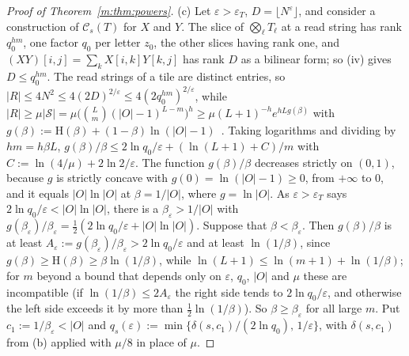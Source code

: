 \documentclass[11pt]{article}
\theoremstyle{definition}
\theoremstyle{remark}
\newcommand{\Hh}{\mathrm{H}}
\begin{document}
\begin{proof}[Proof of Theorem~\ref{m:thm:powers}]
(c) Let $\varepsilon>\varepsilon_T$, $D=\lfloor N^\varepsilon\rfloor$, and consider a construction of $\mathcal C_s(T)$ for $X$ and $Y$. The slice of $\bigotimes_\ell T_\ell$ at a read string has rank $q_0^{hm}$, one factor $q_0$ per letter $z_0$, the other slices having rank one, and $(XY)[i,j]=\sum_kX[i,k]Y[k,j]$ has rank $D$ as a bilinear form; so (iv) gives $D\le q_0^{hm}$. The read strings of a tile are distinct entries, so $|R|\le4N^2\le4(2D)^{2/\varepsilon}\le4(2q_0^{hm})^{2/\varepsilon}$, while $|R|\ge\mu|\mathcal S|=\mu\big(\binom Lm(|O|-1)^{L-m}\big)^h\ge\mu(L+1)^{-h}e^{hLg(\beta)}$ with $g(\beta):=\Hh(\beta)+(1-\beta)\ln(|O|-1)$~\cite[Theorem~11.1.3]{CT06}.
Taking logarithms and dividing by $hm=h\beta L$, $g(\beta)/\beta\le2\ln q_0/\varepsilon+(\ln(L+1)+C)/m$ with $C:=\ln(4/\mu)+2\ln2/\varepsilon$. The function $g(\beta)/\beta$ decreases strictly on $(0,1)$, because $g$ is strictly concave with $g(0)=\ln(|O|-1)\ge0$, from $+\infty$ to $0$, and it equals $|O|\ln|O|$ at $\beta=1/|O|$, where $g=\ln|O|$. As $\varepsilon>\varepsilon_T$ says $2\ln q_0/\varepsilon<|O|\ln|O|$, there is a $\beta_\varepsilon>1/|O|$ with $g(\beta_\varepsilon)/\beta_\varepsilon=\frac12(2\ln q_0/\varepsilon+|O|\ln|O|)$. Suppose that $\beta<\beta_\varepsilon$. Then $g(\beta)/\beta$ is at least $A_\varepsilon:=g(\beta_\varepsilon)/\beta_\varepsilon>2\ln q_0/\varepsilon$ and at least $\ln(1/\beta)$, since $g(\beta)\ge\Hh(\beta)\ge\beta\ln(1/\beta)$, while $\ln(L+1)\le\ln(m+1)+\ln(1/\beta)$; for $m$ beyond a bound that depends only on $\varepsilon$, $q_0$, $|O|$ and $\mu$ these are incompatible (if $\ln(1/\beta)\le2A_\varepsilon$ the right side tends to $2\ln q_0/\varepsilon$, and otherwise the left side exceeds it by more than $\frac12\ln(1/\beta)$). So $\beta\ge\beta_\varepsilon$ for all large $m$. Put $c_1:=1/\beta_\varepsilon<|O|$ and $q_s(\varepsilon):=\min\{\delta(s,c_1)/(2\ln q_0),\,1/\varepsilon\}$, with $\delta(s,c_1)$ from (b) applied with $\mu/8$ in place of $\mu$.


\end{proof}
\end{document}
